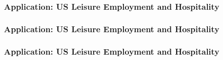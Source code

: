 \documentclass{beamer}
\begin{document}
\begin{frame}
  \frametitle{Application:  US Leisure Employment and Hospitality}
\end{frame}


\begin{frame}
  \frametitle{Application:  US Leisure Employment and Hospitality}
\end{frame}

\begin{frame}
  \frametitle{Application:  US Leisure Employment and Hospitality}
\end{frame}
\end{document}
